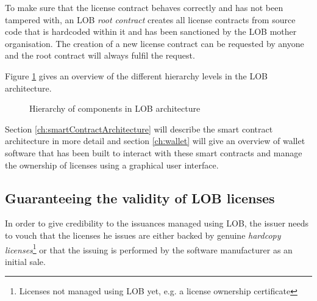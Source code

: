 \documentclass[a4paper]{article}
\begin{document}
To make sure that the license contract behaves correctly and has not been tampered with, an LOB \emph{root contract} creates all license contracts from source code that is hardcoded within it and has been sanctioned by the LOB mother organisation. The creation of a new license contract can be requested by anyone and the root contract will always fulfil the request.

Figure \ref{fig:smartContractHierarchy} gives an overview of the different hierarchy levels in the LOB architecture.

\begin{figure}
  \centering
  \caption{Hierarchy of components in LOB architecture}
  \label{fig:smartContractHierarchy}
\end{figure}


Section \ref{ch:smartContractArchitecture} will describe the smart contract architecture in more detail and section \ref{ch:wallet} will give an overview of wallet software that has been built to interact with these smart contracts and manage the ownership of licenses using a graphical user interface.





\subsection{Guaranteeing the validity of LOB licenses}
\label{ch:licenseValidityOverview}

In order to give credibility to the issuances managed using LOB, the issuer needs to vouch that the licenses he issues are either backed by genuine \emph{hardcopy licenses}\footnote{Licenses not managed using LOB yet, e.g. a license ownership certificate} or that the issuing is performed by the software manufacturer as an initial sale. 
\end{document}
